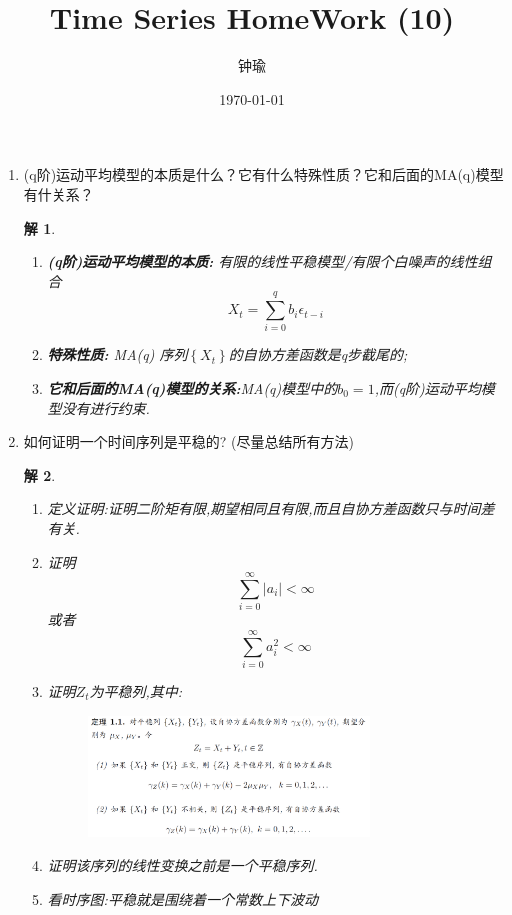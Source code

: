\documentclass[11pt,a4paper]{ctexart}
\title{Time Series HomeWork (10)}
\author{钟瑜 \quad 222018314210044}
\date{\today}
\newtheorem*{solution}{解}
\begin{document}
\maketitle
\pagestyle{plain}%
\begin{enumerate}
	
\item[1.] (q阶)运动平均模型的本质是什么？它有什么特殊性质？它和后面的MA(q)模型有什关系？
\begin{solution}
\begin{enumerate}
	\item[1.]\textbf{ (q阶)运动平均模型的本质:} 有限的线性平稳模型/有限个白噪声的线性组合
	$$ X_t=\sum_{i=0}^{q}b_i\epsilon_{t-i} $$
	
	\item[2.]\textbf{特殊性质:} MA(q) 序列$ \left\lbrace X_t \right\rbrace  $的自协方差函数是q步截尾的;
	\item[3.]\textbf{它和后面的MA(q)模型的关系:}MA(q)模型中的$ b_0=1 $,而(q阶)运动平均模型没有进行约束.
\end{enumerate}
\end{solution}
\item[2.] 如何证明一个时间序列是平稳的? (尽量总结所有方法)
\begin{solution}
\begin{enumerate}
	\item[1.]定义证明:证明二阶矩有限,期望相同且有限,而且自协方差函数只与时间差有关.
	\item[2.]证明$$\sum_{i=0}^{\infty}|a_i|<\infty$$或者$$\sum_{i=0}^{\infty}a_i^2<\infty$$
	\item[3.]证明$ Z_t $为平稳列,其中:
	\begin{figure}[H]
		\centering
		\includegraphics[width=0.75\textwidth]{1.png}  
	\end{figure}
	\item[4.]证明该序列的线性变换之前是一个平稳序列.
	\item[5.]看时序图:平稳就是围绕着一个常数上下波动
\end{enumerate}
\end{solution}


\end{enumerate}
\end{document}
